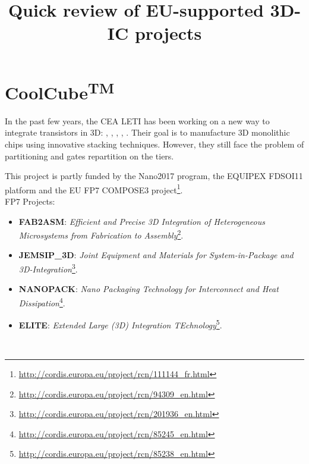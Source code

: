 \documentclass[11pt,a4paper]{extarticle}
\title{Quick review of EU-supported 3D-IC projects}
\theoremstyle{customdef}
\begin{document}
\maketitle

\section*{CoolCube\textsuperscript{TM}}
In the past few years, the CEA LETI has been working on a new way to integrate transistors in 3D: \cite{Clermidy2015}, \cite{Michailos2016}, \cite{Brunet2016}, \cite{Vinet2016}, \cite{Batude2015}.
Their goal is to manufacture 3D monolithic chips using innovative stacking techniques.
However, they still face the problem of partitioning and gates repartition on the tiers.

This project is partly funded by the Nano2017 program, the EQUIPEX FDSOI11 platform and the EU FP7 COMPOSE3 project\footnote{\url{http://cordis.europa.eu/project/rcn/111144_fr.html}}.\\

FP7 Projects:
\begin{itemize}
	\item \textbf{FAB2ASM}: \textit{Efficient and Precise 3D Integration of Heterogeneous Microsystems from Fabrication to Assembly}\footnote{\url{http://cordis.europa.eu/project/rcn/94309_en.html}}.
	\item \textbf{JEMSIP\_3D}: \textit{Joint Equipment and Materials for System-in-Package and 3D-Integration}\footnote{\url{http://cordis.europa.eu/project/rcn/201936_en.html}}.
	\item \textbf{NANOPACK}: \textit{Nano Packaging Technology for Interconnect and Heat Dissipation}\footnote{\url{http://cordis.europa.eu/project/rcn/85245_en.html}}.
	\item \textbf{ELITE}: \textit{Extended Large (3D) Integration TEchnology}\footnote{\url{http://cordis.europa.eu/project/rcn/85238_en.html}}.
\end{itemize}
~\\
\end{document}
